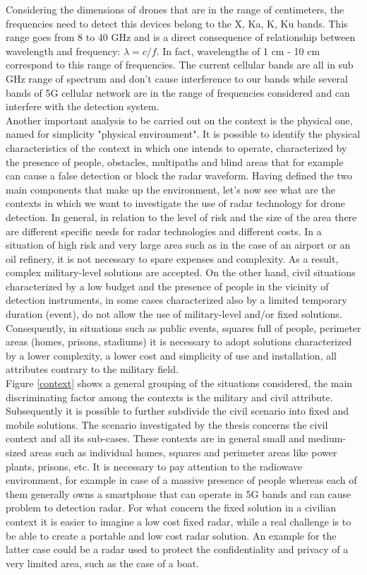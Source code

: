 Considering the dimensions of drones that are in the range of centimeters, the frequencies need to detect this devices belong to the X, Ka, K, Ku bands. This range goes from 8 to 40 GHz and is a direct consequence of relationship between wavelength and frequency: $\lambda = c/f$. In fact, wavelengths of 1 cm - 10 cm correspond to this range of frequencies.
The current cellular bands are all in sub GHz range of spectrum and don't cause interference to our bands while several bands of 5G cellular network are in the range of frequencies considered and can interfere with the detection system. \\ Another important analysis to be carried out on the context is the physical one, named for simplicity "physical environment". It is possible to identify the physical characteristics of the context in which one intends to operate, characterized by the presence of people, obstacles, multipaths and blind areas that for example can cause a false detection or block the radar waveform. Having defined the two main components that make up the environment, let's now see what are the contexts in which we want to investigate the use of radar technology for drone detection. In general, in relation to the level of risk and the size of the area there are different specific needs for radar technologies and different costs. In a situation of high risk and very large area such as in the case of an airport or an oil refinery, it is not necessary to spare expenses and complexity. As a result, complex military-level solutions are accepted. On the other hand, civil situations characterized by a low budget and the presence of people in the vicinity of detection instruments, in some cases characterized also by a limited temporary duration (event), do not allow the use of military-level and/or fixed solutions. Consequently, in situations such as public events, squares full of people, perimeter areas (homes, prisons, stadiums) it is necessary to adopt solutions characterized by a lower complexity, a lower cost and simplicity of use and installation, all attributes contrary to the military field. \\ Figure \ref{context} shows a general grouping of the situations considered, the main discriminating factor among the contexts is the military and civil attribute. Subsequently it is possible to further subdivide the civil scenario into fixed and mobile solutions. The scenario investigated by the thesis concerns the civil context and all its sub-cases. These contexts are in general small and medium-sized areas such as individual homes, squares and perimeter areas like power plants, prisons, etc. It is necessary to pay attention to the radiowave environment, for example in case of a massive presence of people whereas each of them generally owns a smartphone that can operate in 5G bands and can cause problem to detection radar. For what concern the fixed solution in a civilian context it is easier to imagine a low cost fixed radar, while a real challenge is to be able to create a portable and low cost radar solution. An example for the latter case could be a radar used to protect the confidentiality and privacy of a very limited area, such as the case of a boat. 

